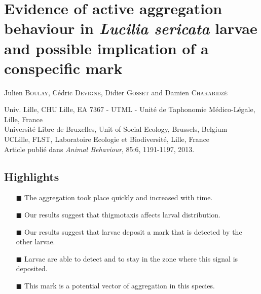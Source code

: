 

\chapter{Evidence of active aggregation behaviour in \emph{Lucilia sericata} larvae and possible implication of a conspecific mark} %

\label{Chapter2} %


Julien \textsc{Boulay}, Cédric \textsc{Devigne}, Didier \textsc{Gosset} and Damien \textsc{Charabidzé}

 Univ. Lille, CHU Lille, EA 7367 - UTML - Unité de Taphonomie Médico-Légale, Lille, France\\
 Université Libre de Bruxelles, Unit of Social Ecology, Brussels, Belgium\\
 UCLille, FLST, Laboratoire Ecologie et Biodiversité, Lille, France\\


Article publié dans \emph{Animal Behaviour}, 85:6, 1191-1197, 2013.

\cleardoublepage

\section{Highlights}
\begin{itemize} 
\item[\tiny{$\blacksquare$}] The aggregation took place quickly and increased with time.
\item[\tiny{$\blacksquare$}] Our results suggest that thigmotaxis affects larval distribution.
\item[\tiny{$\blacksquare$}] Our results suggest that larvae deposit a mark that is detected by the other larvae.
\item[\tiny{$\blacksquare$}] Larvae are able to detect and to stay in the zone where this signal is deposited.
\item[\tiny{$\blacksquare$}] This mark is a potential vector of aggregation in this species.
\end{itemize}


